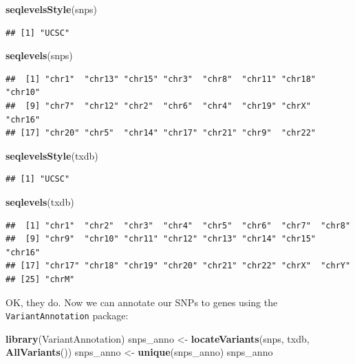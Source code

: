 \documentclass[9pt,a4paper,]{extarticle}
\newenvironment{Shaded}{\begin{snugshade}}{\end{snugshade}}
\newcommand{\KeywordTok}[1]{\textcolor[rgb]{0.13,0.29,0.53}{\textbf{#1}}}
\newcommand{\StringTok}[1]{\textcolor[rgb]{0.31,0.60,0.02}{#1}}
\newcommand{\NormalTok}[1]{#1}
\begin{document}
\begin{Shaded}
\begin{Highlighting}[]
\KeywordTok{seqlevelsStyle}\NormalTok{(snps)}
\end{Highlighting}
\end{Shaded}

\begin{verbatim}
## [1] "UCSC"
\end{verbatim}

\begin{Shaded}
\begin{Highlighting}[]
\KeywordTok{seqlevels}\NormalTok{(snps)}
\end{Highlighting}
\end{Shaded}

\begin{verbatim}
##  [1] "chr1"  "chr13" "chr15" "chr3"  "chr8"  "chr11" "chr18" "chr10"
##  [9] "chr7"  "chr12" "chr2"  "chr6"  "chr4"  "chr19" "chrX"  "chr16"
## [17] "chr20" "chr5"  "chr14" "chr17" "chr21" "chr9"  "chr22"
\end{verbatim}

\begin{Shaded}
\begin{Highlighting}[]
\KeywordTok{seqlevelsStyle}\NormalTok{(txdb)}
\end{Highlighting}
\end{Shaded}

\begin{verbatim}
## [1] "UCSC"
\end{verbatim}

\begin{Shaded}
\begin{Highlighting}[]
\KeywordTok{seqlevels}\NormalTok{(txdb)}
\end{Highlighting}
\end{Shaded}

\begin{verbatim}
##  [1] "chr1"  "chr2"  "chr3"  "chr4"  "chr5"  "chr6"  "chr7"  "chr8" 
##  [9] "chr9"  "chr10" "chr11" "chr12" "chr13" "chr14" "chr15" "chr16"
## [17] "chr17" "chr18" "chr19" "chr20" "chr21" "chr22" "chrX"  "chrY" 
## [25] "chrM"
\end{verbatim}

OK, they do.
Now we can annotate our SNPs to genes using the \texttt{VariantAnnotation} \citep{Obenchain2014} package:

\begin{Shaded}
\begin{Highlighting}[]
\KeywordTok{library}\NormalTok{(VariantAnnotation)}
\NormalTok{snps_anno <-}\StringTok{ }\KeywordTok{locateVariants}\NormalTok{(snps, txdb, }\KeywordTok{AllVariants}\NormalTok{())}
\NormalTok{snps_anno <-}\StringTok{ }\KeywordTok{unique}\NormalTok{(snps_anno)}
\NormalTok{snps_anno}
\end{Highlighting}
\end{Shaded}
\end{document}
